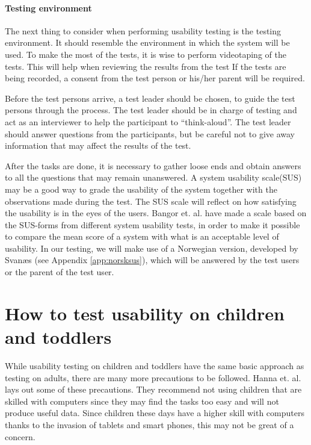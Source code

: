 \paragraph{Testing environment}
\label{par:testingenvironment}
The next thing to consider when performing usability testing is the testing environment. It should resemble the environment in which the system will be used. To make the most of the tests, it is wise to perform videotaping of the tests. This will help when reviewing the results from the test If the tests are being recorded, a consent from the test person or his/her parent will be required.

Before the test persons arrive, a test leader should be chosen, to guide the test persons through the process. The test leader should be in charge of testing and act as an interviewer to help the participant to ``think-aloud''\cite{lewis1982using}. The test leader should answer questions from the participants, but be careful not to give away information that may affect the results of the test.

After the tasks are done, it is necessary to gather loose ends and obtain answers to all the questions that may remain unanswered. A system usability scale(SUS)\cite{sus} may be a good way to grade the usability of the system together with the observations made during the test. The SUS scale will reflect on how satisfying the usability is in the eyes of the users. Bangor et. al.\cite{susform} have made a scale based on the SUS-forms from different system usability tests, in order to make it possible to compare the mean score of a system with what is an acceptable level of usability. In our testing, we will make use of a Norwegian version, developed by Svan\ae s (see Appendix \ref{app:norsksus}), which will be answered by the test users or the parent of the test user.


\section{How to test usability on children and toddlers}
\label{sec:usabilitytestchildren}
While usability testing on children and toddlers have the same basic approach as testing on adults, there are many more precautions to be followed. 
Hanna et. al.\cite{testingenvironmentforchildren} lays out some of these precautions. They recommend not using children that are skilled with computers since they may find the tasks too easy and will not produce useful data. 
Since children these days have a higher skill with computers thanks to the invasion of tablets and smart phones\cite{babiesusageoftablets}, this may not be great of a concern. 


